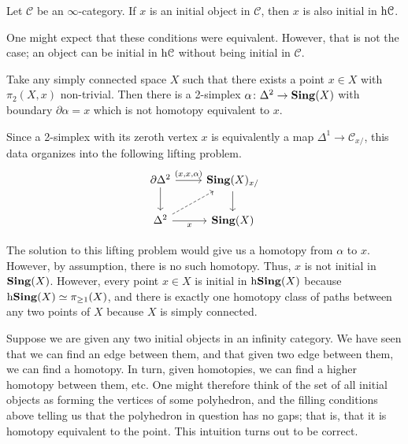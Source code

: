 \documentclass[main.tex]{subfiles}
\begin{document}
\begin{corollary}
  Let $\mathcal{C}$ be an $\infty$-category. If $x$ is an initial object in $\mathcal{C}$, then $x$ is also initial in $\mathrm{h}\mathcal{C}$.
\end{corollary}

One might expect that these conditions were equivalent. However, that is not the case; an object can be initial in $\mathrm{h} \mathcal{C}$ without being initial in $\mathcal{C}$.

\begin{example}
  Take any simply connected space $X$ such that there exists a point $x \in X$ with $\pi_{2}(X, x)$ non-trivial. Then there is a 2-simplex $\alpha\colon \Delta^{2} \to \mathbf{Sing}(X)$ with boundary $\partial \alpha = x$ which is not homotopy equivalent to $x$.

  Since a 2-simplex with its zeroth vertex $x$ is equivalently a map $\Delta^{1} \to \mathcal{C}_{x/}$, this data organizes into the following lifting problem.
  \begin{equation*}
    \begin{tikzcd}
      \partial \Delta^{2}
      \arrow[r, "{(x,x,\alpha)}"]
      \arrow[d]
      & \Sing(X)_{x/}
      \arrow[d]
      \\
      \Delta^{2}
      \arrow[ur, dashed]
      \arrow[r, swap, "x"]
      & \Sing(X)
    \end{tikzcd}
  \end{equation*}

  The solution to this lifting problem would give us a homotopy from $\alpha$ to $x$. However, by assumption, there is no such homotopy. Thus, $x$ is not initial in $\mathbf{Sing}(X)$. However, every point $x \in X$ is initial in $\mathrm{h} \mathbf{Sing}(X)$ because $\mathrm{h} \mathbf{Sing}(X) \simeq \pi_{\geq 1}(X)$, and there is exactly one homotopy class of paths between any two points of $X$ because $X$ is simply connected.
\end{example}

Suppose we are given any two initial objects in an infinity category. We have seen that we can find an edge between them, and that given two edge between them, we can find a homotopy. In turn, given homotopies, we can find a higher homotopy between them, etc. One might therefore think of the set of all initial objects as forming the vertices of some polyhedron, and the filling conditions above telling us that the polyhedron in question has no gaps; that is, that it is homotopy equivalent to the point. This intuition turns out to be correct.
\end{document}
